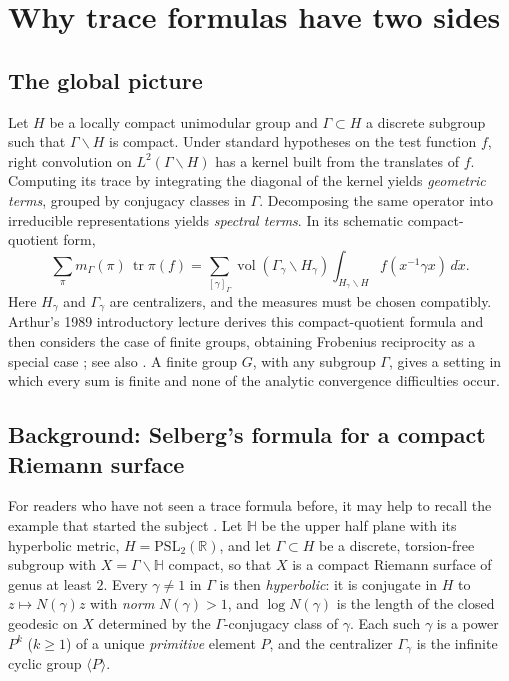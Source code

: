\documentclass[12pt]{article}
\theoremstyle{remark}
\newcommand{\tr}{\operatorname{tr}}
\begin{document}
\section{Why trace formulas have two sides}
\subsection{The global picture}
Let $H$ be a locally compact unimodular group and $\Gamma\subset H$ a
discrete subgroup such that $\Gamma\backslash H$ is compact.  Under
standard hypotheses on the test function $f$, right convolution on
$L^2(\Gamma\backslash H)$ has a kernel built from the translates of $f$.
Computing its trace by integrating the diagonal of the kernel yields
\emph{geometric terms}, grouped by conjugacy classes in $\Gamma$.
Decomposing the same operator into irreducible representations yields
\emph{spectral terms}.  In its schematic compact-quotient form,
\begin{equation}\label{eq:realcompact}
 \sum_{\pi}m_\Gamma(\pi)\,\tr\pi(f)
 =\sum_{[\gamma]_\Gamma}
 \operatorname{vol}(\Gamma_\gamma\backslash H_\gamma)
 \int_{H_\gamma\backslash H}f(x^{-1}\gamma x)\,d\dot x.
\end{equation}
Here $H_\gamma$ and $\Gamma_\gamma$ are centralizers, and the
measures must be chosen compatibly. Arthur's 1989 introductory
lecture derives this compact-quotient formula and then considers the
case of finite groups, obtaining Frobenius reciprocity as a special
case \cite[Example~2, p.~14]{ArthurHecke1989}; see also
\cite[\S1]{ArthurIntro2005}.
A finite group $G$, with any subgroup $\Gamma$, gives a setting in which
every sum is finite and none of the analytic convergence difficulties occur.

\subsection{Background: Selberg's formula for a compact Riemann surface}
\label{subsec:selberg-classical}
For readers who have not seen a trace formula before, it may help to
recall the example that started the subject \cite{Selberg1956}.
Let $\mathbb H$ be the upper half plane with its hyperbolic metric,
$H=\mathrm{PSL}_2(\mathbb R)$, and let $\Gamma\subset H$ be a discrete,
torsion-free subgroup with $X=\Gamma\backslash\mathbb H$ compact, so
that $X$ is a compact Riemann surface of genus at least $2$.
Every $\gamma\ne1$ in $\Gamma$ is then \emph{hyperbolic}: it is conjugate
in $H$ to $z\mapsto N(\gamma)z$ with \emph{norm} $N(\gamma)>1$, and
$\log N(\gamma)$ is the length of the closed geodesic on $X$ determined
by the $\Gamma$-conjugacy class of $\gamma$.  Each such $\gamma$ is a
power $P^k$ ($k\ge1$) of a unique \emph{primitive} element $P$, and the
centralizer $\Gamma_\gamma$ is the infinite cyclic group $\langle P\rangle$.
\end{document}
